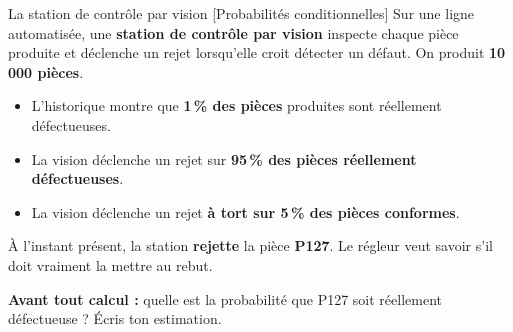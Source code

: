 \documentclass[a4paper,11pt]{article}
\begin{document}
\begin{exo}{La station de contrôle par vision \hfill \normalfont\color{uimmlightblue}[Probabilités conditionnelles]}
Sur une ligne automatisée, une \textbf{station de contrôle par vision} inspecte chaque pièce produite et déclenche un rejet lorsqu'elle croit détecter un défaut. On produit \textbf{10\,000 pièces}.

\begin{itemize}
  \item L'historique montre que \textbf{1\,\% des pièces} produites sont réellement défectueuses.
  \item La vision déclenche un rejet sur \textbf{95\,\% des pièces réellement défectueuses}.
  \item La vision déclenche un rejet \textbf{à tort sur 5\,\% des pièces conformes}.
\end{itemize}

À l'instant présent, la station \textbf{rejette} la pièce \textbf{P127}. Le régleur veut savoir s'il doit vraiment la mettre au rebut.

\begin{intuition}
\textbf{Avant tout calcul :} quelle est la probabilité que P127 soit réellement défectueuse ? Écris ton estimation. \dotfill
\end{intuition}


\end{exo}
\end{document}
